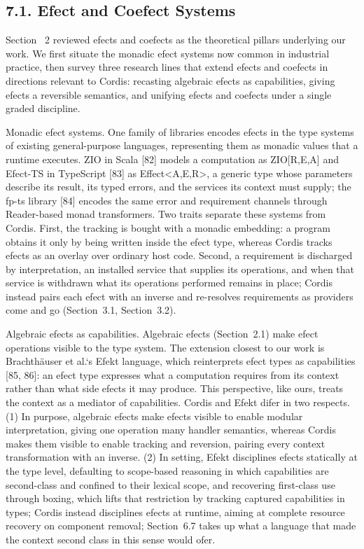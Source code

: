 \documentclass[
  10
]{article}
\begin{document}
\subsection{7.1. Efect and Coefect
Systems}\label{efect-and-coefect-systems}

Section~ 2 reviewed efects and coefects as the theoretical pillars
underlying our work. We first situate the monadic efect systems now
common in industrial practice, then survey three research lines that
extend efects and coefects in directions relevant to Cordis: recasting
algebraic efects as capabilities, giving efects a reversible semantics,
and unifying efects and coefects under a single graded discipline.

Monadic efect systems. One family of libraries encodes efects in the
type systems of existing general-purpose languages, representing them as
monadic values that a runtime executes. ZIO in Scala {[}82{]} models a
computation as ZIO{[}R,E,A{]} and Efect-TS in TypeScript {[}83{]} as
Effect\textless A,E,R\textgreater, a generic type whose parameters
describe its result, its typed errors, and the services its context must
supply; the fp-ts library {[}84{]} encodes the same error and
requirement channels through Reader-based monad transformers. Two traits
separate these systems from Cordis. First, the tracking is bought with a
monadic embedding: a program obtains it only by being written inside the
efect type, whereas Cordis tracks efects as an overlay over ordinary
host code. Second, a requirement is discharged by interpretation, an
installed service that supplies its operations, and when that service is
withdrawn what its operations performed remains in place; Cordis instead
pairs each efect with an inverse and re-resolves requirements as
providers come and go (Section~3.1, Section~3.2).

Algebraic efects as capabilities. Algebraic efects (Section~2.1) make
efect operations visible to the type system. The extension closest to
our work is Brachthäuser et al.`s Efekt language, which reinterprets
efect types as capabilities {[}85, 86{]}: an efect type expresses what a
computation requires from its context rather than what side efects it
may produce. This perspective, like ours, treats the context as a
mediator of capabilities. Cordis and Efekt difer in two respects. (1) In
purpose, algebraic efects make efects visible to enable modular
interpretation, giving one operation many handler semantics, whereas
Cordis makes them visible to enable tracking and reversion, pairing
every context transformation with an inverse. (2) In setting, Efekt
disciplines efects statically at the type level, defaulting to
scope-based reasoning in which capabilities are second-class and
confined to their lexical scope, and recovering first-class use through
boxing, which lifts that restriction by tracking captured capabilities
in types; Cordis instead disciplines efects at runtime, aiming at
complete resource recovery on component removal; Section~6.7 takes up
what a language that made the context second class in this sense would
ofer.
\end{document}
